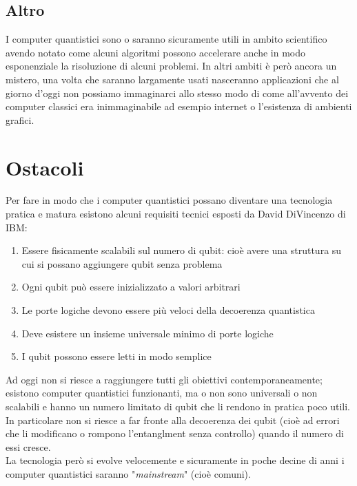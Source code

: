 \subsection{Altro}
I computer quantistici sono o saranno sicuramente utili in ambito scientifico avendo notato come alcuni algoritmi possono accelerare anche in modo esponenziale la risoluzione di alcuni problemi. In altri ambiti è però ancora un mistero, una volta che saranno largamente usati nasceranno applicazioni che al giorno d'oggi non possiamo immaginarci allo stesso modo di come all'avvento dei computer classici era inimmaginabile ad esempio internet o l'esistenza di ambienti grafici.
\section{Ostacoli}
Per fare in modo che i computer quantistici possano diventare una tecnologia pratica e matura esistono alcuni requisiti tecnici esposti da David DiVincenzo di IBM:
\begin{enumerate}
\item Essere fisicamente scalabili sul numero di qubit: cioè avere una struttura su cui si possano aggiungere qubit senza problema
\item Ogni qubit può essere inizializzato a valori arbitrari
\item Le porte logiche devono essere più veloci della decoerenza quantistica
\item Deve esistere un insieme universale minimo di porte logiche
\item I qubit possono essere letti in modo semplice
\end{enumerate}
Ad oggi non si riesce a raggiungere tutti gli obiettivi contemporaneamente; esistono computer quantistici funzionanti, ma o non sono universali o non scalabili e hanno un numero limitato di qubit che li rendono in pratica poco utili. In particolare non si riesce a far fronte alla decoerenza dei qubit (cioè ad errori che li modificano o rompono l'entanglment senza controllo) quando il numero di essi cresce.\\
La tecnologia però si evolve velocemente e sicuramente in poche decine di anni i computer quantistici saranno "\textit{mainstream}" (cioè comuni).
